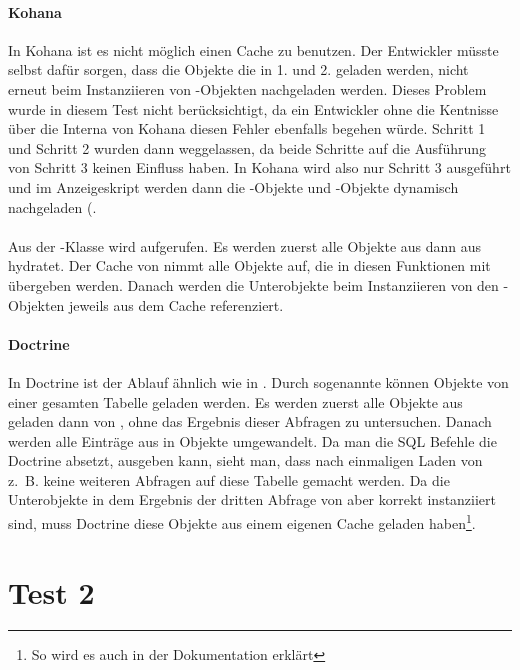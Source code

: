 \paragraph{Kohana}
In Kohana ist es nicht möglich einen Cache zu benutzen. Der Entwickler müsste selbst dafür sorgen, dass die Objekte die in 1. und 2. geladen werden, nicht erneut beim Instanziieren von -Objekten nachgeladen werden. Dieses Problem wurde in diesem Test nicht berücksichtigt, da ein Entwickler ohne die Kentnisse über die Interna von Kohana diesen Fehler ebenfalls begehen würde. Schritt 1 und Schritt 2 wurden dann weggelassen, da beide Schritte auf die Ausführung von Schritt 3 keinen Einfluss haben. In Kohana wird also nur Schritt 3 ausgeführt und im Anzeigeskript werden dann die -Objekte und -Objekte dynamisch nachgeladen (.
\paragraph{\PSCORM}
Aus der -Klasse wird  aufgerufen. Es werden zuerst alle Objekte aus  dann aus  hydratet. Der Cache von \PSCORM nimmt alle Objekte auf, die in diesen Funktionen mit  übergeben werden. Danach werden die Unterobjekte beim Instanziieren von den -Objekten jeweils aus dem Cache referenziert. 
\paragraph{Doctrine}
In Doctrine ist der Ablauf ähnlich wie in \PSCORM. Durch sogenannte  können Objekte von einer gesamten Tabelle geladen werden. Es werden zuerst alle Objekte aus  geladen dann von , ohne das Ergebnis dieser Abfragen zu untersuchen. Danach werden alle Einträge aus  in Objekte umgewandelt. Da man die SQL Befehle die Doctrine absetzt, ausgeben kann, sieht man, dass nach einmaligen Laden von z.~B.  keine weiteren Abfragen auf diese Tabelle gemacht werden. Da die Unterobjekte in dem Ergebnis der dritten Abfrage von  aber korrekt instanziiert sind, muss Doctrine diese Objekte aus einem eigenen Cache geladen haben\footnote{So wird es auch in der Dokumentation erklärt}. \\

\section{Test 2}

